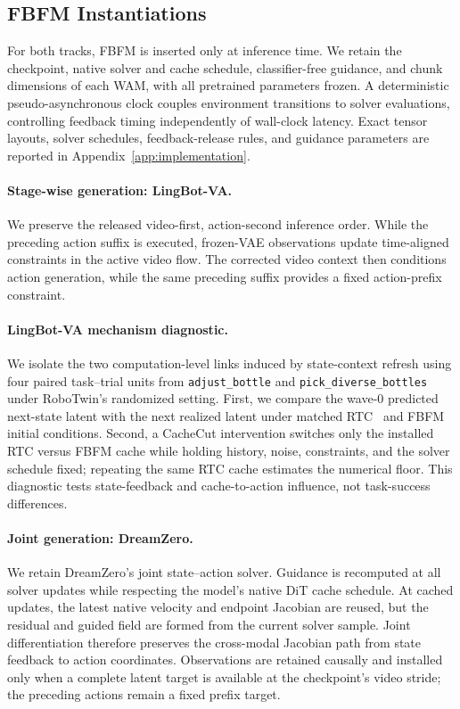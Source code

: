 
\subsection{FBFM Instantiations}
\label{subsec:fbfm-instantiations}

For both tracks, FBFM is inserted only at inference time. We retain the
checkpoint, native solver and cache schedule, classifier-free guidance, and
chunk dimensions of each WAM, with all pretrained parameters frozen. A
deterministic pseudo-asynchronous clock couples environment transitions to
solver evaluations, controlling feedback timing independently of wall-clock
latency. Exact tensor layouts, solver schedules, feedback-release rules, and
guidance parameters are reported in Appendix~\ref{app:implementation}.

\paragraph{Stage-wise generation: LingBot-VA.}
We preserve the released video-first, action-second inference order. While the
preceding action suffix is executed, frozen-VAE observations update
time-aligned constraints in the active video flow. The corrected video context
then conditions action generation, while the same preceding suffix provides a
fixed action-prefix constraint.

\paragraph{LingBot-VA mechanism diagnostic.}
We isolate the two computation-level links induced by state-context refresh
using four paired task--trial units from
\texttt{adjust\_bottle} and \texttt{pick\_diverse\_bottles} under RoboTwin's
randomized setting. First, we compare the wave-0 predicted next-state latent
with the next realized latent under matched RTC~\cite{black2025realtime} and
FBFM initial conditions. Second, a CacheCut intervention switches only the
installed RTC versus FBFM cache while holding history, noise, constraints, and
the solver schedule fixed; repeating the same RTC cache estimates the numerical
floor. This diagnostic tests state-feedback and cache-to-action influence, not
task-success differences.

\paragraph{Joint generation: DreamZero.}
We retain DreamZero's joint state--action solver. Guidance is recomputed at all
solver updates while respecting the model's native DiT cache schedule. At
cached updates, the latest native velocity and endpoint Jacobian are reused,
but the residual and guided field are formed from the current solver sample.
Joint differentiation therefore preserves the cross-modal Jacobian path from
state feedback to action coordinates. Observations are retained causally and
installed only when a complete latent target is available at the checkpoint's
video stride; the preceding actions remain a fixed prefix target.

